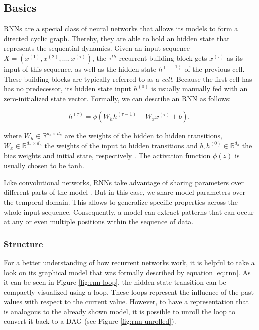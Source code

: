 \subsection{Basics}

RNNs are a special class of neural networks that allows its models to form a directed cyclic graph. Thereby, they are able to hold an hidden state that represents the sequential dynamics. Given an input sequence $ X = (x^{(1)}, x^{(2)},..., x^{(\tau)}) $, the $ \tau^{th} $ recurrent building block gets $x^{(\tau)}$ as its input of this sequence, as well as the hidden state $h^{(\tau-1)}$ of the previous cell. These building blocks are typically referred to as a \textit{cell}. Because the first cell has has no predecessor, its hidden state input $ h^{(0)} $ is usually manually fed with an zero-initialized state vector. Formally, we can describe an RNN as follows:

\begin{equation} \label{eq:rnn}
  h^{(\tau)} = \phi(W_{h} h^{(\tau-1)} + W_{x} x^{(\tau)} + b) ,
\end{equation}

where $ W_{h} \in \mathbb{R}^{d_h \times d_h} $ are the weights of the hidden to hidden transitions, $ W_{x} \in \mathbb{R}^{d_x \times d_h} $ the weights of the input to hidden transitions and $ b, h^{(0)} \in \mathbb{R}^{d_h} $ the bias weights and initial state, respectively \parencite[p. 2]{rnn-batchnorm}. The activation function $ \phi(z) $ is usually chosen to be tanh.

Like convolutional networks, RNNs take advantage of sharing parameters over different parts of the model \parencite[p. 374]{deep_learning}. But in this case, we share model parameters over the temporal domain. This allows to generalize specific properties across the whole input sequence. Consequently, a model can extract patterns that can occur at any or even multiple positions within the sequence of data.

\subsubsection{Structure}

For a better understanding of how recurrent networks work, it is helpful to take a look on its graphical model that was formally described by equation \ref{eq:rnn}. As it can be seen in Figure \ref{fig:rnn-loop}, the hidden state transition can be compactly visualized using a loop. These loops represent the influence of the past values with respect to the current value. However, to have a representation that is analogous to the already shown model, it is possible to unroll the loop to convert it back to a DAG (see Figure \ref{fig:rnn-unrolled}).

